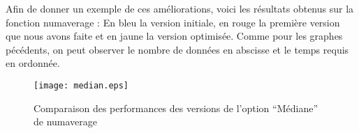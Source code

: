 Afin de donner un exemple de ces am\'eliorations, voici les r\'esultats obtenus sur la fonction numaverage : 
En bleu la version initiale, en rouge la premi\`ere version que nous avons faite et en jaune la version optimis\'ee.
Comme pour les graphes p\'ec\'edents, on peut observer le nombre de donn\'ees en abscisse et le temps requis en ordonn\'ee.

\begin{figure}[h]
\begin{center}
\texttt{[image: median.eps]}
\end{center}
\caption{Comparaison des performances des versions de l'option ``M\'ediane'' de numaverage}
\label{fig:numprocess}
\end{figure}
